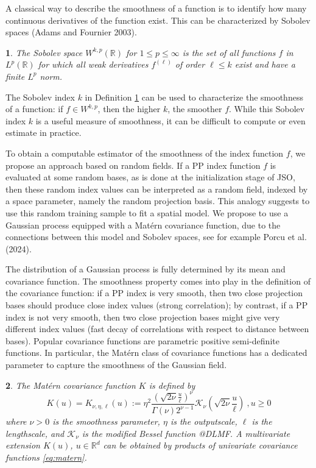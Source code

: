 \documentclass[
  12pt,
]{interact}
\theoremstyle{plain}
\newtheorem{defn}{\protect\definitionname}
\providecommand{\definitionname}{Definition}
\begin{document}
A classical way to describe the smoothness of a function is to identify
how many continuous derivatives of the function exist. This can be
characterized by Sobolev spaces (Adams and Fournier 2003).

\begin{defn}\label{def:sobolev_space}
The Sobolev space $W^{k,p}(\mathbb{R})$ for $1\leq p\leq \infty$ is the set of all functions $f$ in $L^p(\mathbb{R})$ for which all weak derivatives $f^{(\ell)}$ of order $\ell\leq k$ exist and have a finite $L^p$ norm.
\end{defn}

The Sobolev index \(k\) in Definition \ref{def:sobolev_space} can be
used to characterize the smoothness of a function: if \(f\in W^{k,p}\),
then the higher \(k\), the smoother \(f\). While this Sobolev index
\(k\) is a useful measure of smoothness, it can be difficult to compute
or even estimate in practice.

To obtain a computable estimator of the smoothness of the index function
\(f\), we propose an approach based on random fields. If a PP index
function \(f\) is evaluated at some random bases, as is done at the
initialization stage of JSO, then these random index values can be
interpreted as a random field, indexed by a space parameter, namely the
random projection basis. This analogy suggests to use this random
training sample to fit a spatial model. We propose to use a Gaussian
process equipped with a Matérn covariance function, due to the
connections between this model and Sobolev spaces, see for example Porcu
et al. (2024).

The distribution of a Gaussian process is fully determined by its mean
and covariance function. The smoothness property comes into play in the
definition of the covariance function: if a PP index is very smooth,
then two close projection bases should produce close index values
(strong correlation); by contrast, if a PP index is not very smooth,
then two close projection bases might give very different index values
(fast decay of correlations with respect to distance between bases).
Popular covariance functions are parametric positive semi-definite
functions. In particular, the Matérn class of covariance functions has a
dedicated parameter to capture the smoothness of the Gaussian field.

\begin{defn}
The Matérn covariance function $K$ is defined by
\begin{equation}
K(u)=K_{\nu,\eta,\ell}(u):=\eta^2\frac{\left(\sqrt{2\nu}\frac{u}{\ell}\right)^{\nu}}{\Gamma(\nu)2^{\nu-1}}\mathcal{K}_{\nu}\left(\sqrt{2\nu}\frac{u}{\ell}\right)\ , u\geq0\label{eq:matern}
\end{equation}
where $\nu>0$ is the smoothness parameter, $\eta$ is the outputscale, $\ell$ is the lengthscale, and $\mathcal{K}_\nu$ is
the modified Bessel function @DLMF. A multivariate extension $K(u)$, $u\in\mathbb{R}^d$ can be obtained by products of univariate covariance functions \eqref{eq:matern}.
\end{defn}
\end{document}
